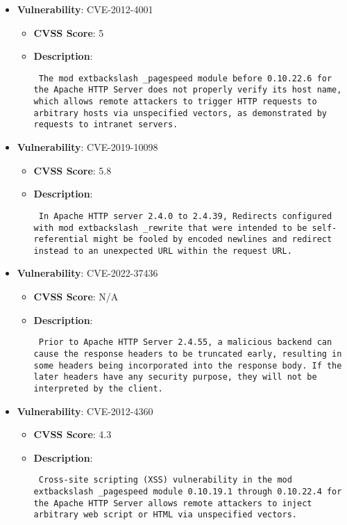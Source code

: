 \documentclass{article}
\begin{document}
\begin{itemize}
        \item \textbf{Vulnerability}: CVE-2012-4001
        \begin{itemize}
            \item \textbf{CVSS Score}:  5 
            \item \textbf{Description}: \parbox{\linewidth}{\texttt{ The mod	extbackslash _pagespeed module before 0.10.22.6 for the Apache HTTP Server does not properly verify its host name, which allows remote attackers to trigger HTTP requests to arbitrary hosts via unspecified vectors, as demonstrated by requests to intranet servers. }}
        \end{itemize}
    
        \item \textbf{Vulnerability}: CVE-2019-10098
        \begin{itemize}
            \item \textbf{CVSS Score}:  5.8 
            \item \textbf{Description}: \parbox{\linewidth}{\texttt{ In Apache HTTP server 2.4.0 to 2.4.39, Redirects configured with mod	extbackslash _rewrite that were intended to be self-referential might be fooled by encoded newlines and redirect instead to an unexpected URL within the request URL. }}
        \end{itemize}
    
        \item \textbf{Vulnerability}: CVE-2022-37436
        \begin{itemize}
            \item \textbf{CVSS Score}:  N/A 
            \item \textbf{Description}: \parbox{\linewidth}{\texttt{ Prior to Apache HTTP Server 2.4.55, a malicious backend can cause the response headers to be truncated early, resulting in some headers being incorporated into the response body. If the later headers have any security purpose, they will not be interpreted by the client. }}
        \end{itemize}
    
        \item \textbf{Vulnerability}: CVE-2012-4360
        \begin{itemize}
            \item \textbf{CVSS Score}:  4.3 
            \item \textbf{Description}: \parbox{\linewidth}{\texttt{ Cross-site scripting (XSS) vulnerability in the mod	extbackslash _pagespeed module 0.10.19.1 through 0.10.22.4 for the Apache HTTP Server allows remote attackers to inject arbitrary web script or HTML via unspecified vectors. }}
        \end{itemize}
    

\end{itemize}
\end{document}
